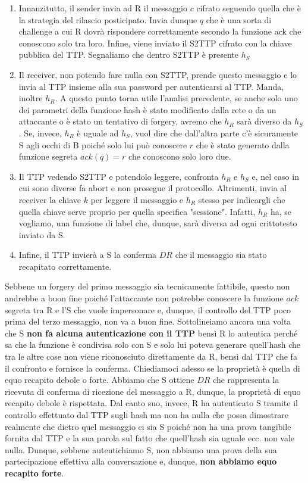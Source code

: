 \begin{enumerate}
    \item Innanzitutto, il sender invia ad R il messaggio $c$ cifrato seguendo quella che è la strategia del rilascio posticipato. Invia dunque $q$ che è una sorta di challenge a cui R dovrà rispondere correttamente secondo la funzione ack che conoscono solo tra loro. Infine, viene inviato il S2TTP cifrato con la chiave pubblica del TTP. Segnaliamo che dentro S2TTP è presente $h_S$
    \item Il receiver, non potendo fare nulla con S2TTP, prende questo messaggio e lo invia al TTP insieme alla sua password per autenticarsi al TTP. Manda, inoltre $h_R$. A questo punto torna utile l'analisi precedente, se anche solo uno dei parametri della funzione hash è stato modificato dalla rete o da un attaccante o è stato un tentativo di forgery, avremo che $h_R$ sarà diverso da $h_S$. Se, invece, $h_R$ è uguale ad $h_S$, vuol dire che dall'altra parte c'è sicuramente S agli occhi di B poiché solo lui può conoscere $r$ che è stato generato dalla funzione segreta $ack(q) = r$ che conoscono solo loro due.
    \item Il TTP vedendo S2TTP e potendolo leggere, confronta $h_R$ e $h_S$ e, nel caso in cui sono diverse fa abort e non prosegue il protocollo. Altrimenti, invia al receiver la chiave $k$ per leggere il messaggio e $h_R$ stesso per indicargli che quella chiave serve proprio per quella specifica "sessione". Infatti, $h_R$ ha, se vogliamo, una funzione di label che, dunque, sarà diversa ad ogni crittotesto inviato da S.
    \item Infine, il TTP invierà a S la conferma $DR$ che il messaggio sia stato recapitato correttamente.
\end{enumerate}
Sebbene un forgery del primo messaggio sia tecnicamente fattibile, questo non andrebbe a buon fine poiché l'attaccante non potrebbe conoscere la funzione $ack$ segreta tra R e l'S che vuole impersonare e, dunque, il controllo del TTP poco prima del terzo messaggio, non va a buon fine.
Sottolineiamo ancora una volta che S \textbf{non fa alcuna autenticazione con il TTP} bensì R lo autentica perché sa che la funzione è condivisa solo con S e solo lui poteva generare quell'hash che tra le altre cose non viene riconosciuto direttamente da R, bensì dal TTP che fa il confronto e fornisce la conferma.
Chiediamoci adesso se la proprietà è quella di equo recapito debole o forte. Abbiamo che S ottiene $DR$ che rappresenta la ricevuta di conferma di ricezione del messaggio a R, dunque, la proprietà di equo recapito debole è rispettata. Dal canto suo, invece, R ha autenticato S tramite il controllo effettuato dal TTP sugli hash ma non ha nulla che possa dimostrare realmente che dietro quel messaggio ci sia S poiché non ha una prova tangibile fornita dal TTP e la sua parola sul fatto che quell'hash sia uguale ecc. non vale nulla. Dunque, sebbene autentichiamo S, non abbiamo una prova della sua partecipazione effettiva alla conversazione e, dunque, \textbf{non abbiamo equo recapito forte}.
